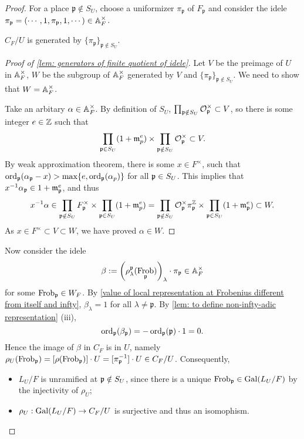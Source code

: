 \documentclass{article}
\renewcommand{\O}{\mathcal{O}}
\newcommand{\m}{\mathfrak{m}}
\DeclareMathOperator{\frob}{Frob}
\begin{document}
\begin{proof}
For a place $\mathfrak{p}\notin S_U$,
choose a uniformizer $\pi_\mathfrak{p}$ of $F_\mathfrak{p}$
and consider the idele $\pi_\mathfrak{p} = (\cdots, 1, \pi_{\mathfrak{p}}, 1, \cdots)\in \mathbb{A}_F^\times$.
\begin{lemma}\label{lem: generators of finite quotient of idele}
    $C_F/U$ is generated by $\{\pi_\mathfrak{p}\}_{\mathfrak{p}\notin S_U}$.
\end{lemma}
\begin{proof}[Proof of \cref{lem: generators of finite quotient of idele}]
    Let $V$ be the preimage of $U$ in $\mathbb{A}_F^\times$, $W$ be the subgroup of $\mathbb{A}_F^\times$ generated by $V$ and $\{\pi_\mathfrak{p}\}_{\mathfrak{p}\notin S_U}$.
    We need to show that $W = \mathbb{A}_F^\times$.

    Take an arbitary $\alpha\in\mathbb{A}_F^\times$.
    By definition of $S_U$, $\prod_{\p\notin S_U}\O_\mathfrak{p}^\times\subset V$,
    so there is some integer $e\in\mathbb{Z}$ such that \[\prod_{\p\in S_U} (1 + \m_p^e)\times\prod_{\p\notin S_U} \O_\p^\times\subset V.\]
    By weak approximation theorem, there is some $x\in F^\times$,
    such that $\operatorname{ord}_{\mathfrak{p}}(\alpha_{\mathfrak{p}} - x) > \max\{e, \operatorname{ord}_{\mathfrak{p}}(\alpha_p)\}$ for all $\mathfrak{p}\in S_U$.
    This implies that $x^{-1}\alpha_\p\in 1 + \m_\p^e$,
    and thus \[x^{-1}\alpha\in \prod_{\p\notin S_U} F_\p^\times\times\prod_{\p\in S_U} (1 + \m_p^e)
    =\prod_{\p\notin S_U} \O_\p^\times\pi_\p^\Z\times\prod_{\p\in S_U} (1 + \m_\p^e)
    \subset W.\]
    As $x\in F^\times\subset V\subset W$, we have proved $\alpha\in W$.
\end{proof}

Now consider the idele \[\beta := \left( \rho_\lambda^\mathfrak{p}(\frob_\mathfrak{p}) \right)_\lambda\cdot \pi_\mathfrak{p}\in \A_F^\times\]
for some $\frob_\p\in W_F$.
By \cref{value of local representation at Frobenius different from itself and infty}, $\beta_\lambda = 1$ for all $\lambda\ne \mathfrak{p}$.
By \cref{lem: to define non-infty-adic representation} (iii),
\[\operatorname{ord}_\mathfrak{p}(\beta_\mathfrak{p}) = -\operatorname{ord}_{\mathfrak{p}}(\mathfrak{p})\cdot 1 = 0.\]
Hence the image of $\beta$ in $C_F$ is in $U$,
namely $\rho_U(\frob_\p) = [\rho(\frob_\p)]\cdot U = [\pi_\p^{-1}]\cdot U\in C_F/U$.
Consequently,\begin{itemize}
    \item $L_U/F$ is unramified at $\mathfrak{p}\notin S_U$, since there is a unique $\frob_\p\in\gal(L_U/F)$ by the injectivity of $\rho_U$;
    \item $\rho_U : \operatorname{Gal}(L_U/F)\to C_F/U$ is surjective and thus an isomophism.
\end{itemize}



\end{proof}
\end{document}
